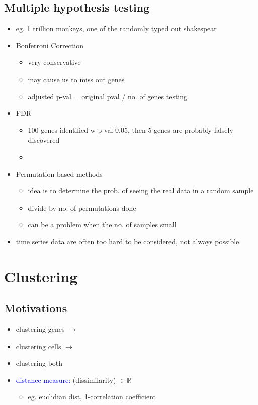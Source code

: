\documentclass[font=12pt]{article}
\begin{document}
\subsection{Multiple hypothesis testing}
\begin{itemize}
	\item eg. 1 trillion monkeys, one of the randomly typed out shakespear
	\item Bonferroni Correction
	\begin{itemize}
		\item very conservative
		\item may cause us to miss out genes
		\item adjusted p-val = original pval / no. of genes testing
	\end{itemize}
	\item FDR
	\begin{itemize}
		\item 100 genes identified w p-val 0.05, then 5 genes are probably falsely discovered
		\item {}
	\end{itemize}
	\item Permutation based methods
	\begin{itemize}
		\item idea is to determine the prob. of seeing the real data in a random sample
		\item divide by no. of permutations done
		\item can be a problem when the no. of samples small
	\end{itemize}
	\item time series data are often too hard to be considered, not always possible
\end{itemize}
\newpage
\section{Clustering}
\subsection{Motivations}
\begin{itemize}
	\item clustering genes $\rightarrow$ 
	\item clustering cells $\rightarrow$
	\item clustering both
	\item \textcolor{blue}{distance measure:} (dissimilarity) $\in\mathbb{R}$
		\begin{itemize}
			\item eg. euclidian dist, 1-correlation coefficient
		\end{itemize}
\end{itemize}
\end{document}
